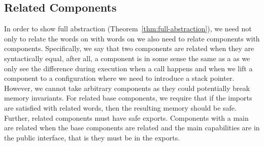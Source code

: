\begin{jversion}
\subsection{Related Components}
\label{subsec:component-rel}
In order to show full abstraction (Theorem~\ref{thm:full-abstraction}), we need not only to relate the words on \srccm{} with words on \trgcm{} we also need to relate \srccm{} components with \trgcm{} components.
Specifically, we say that two components are related when they are syntactically equal, after all, a \srccm{} component is in some sense the same as a \trgcm{} as we only see the difference during execution when a call happens and when we lift a component to a configuration where we need to introduce a stack pointer.
However, we cannot take arbitrary components as they could potentially break memory invariants.
For related base components, we require that if the imports are satisfied with related words, then the resulting memory should be safe.
Further, related components must have safe exports.
Components with a main are related when the base components are related and the main capabilities are in the public interface, that is they must be in the exports.


\end{jversion}
